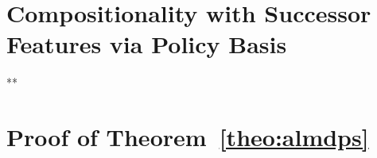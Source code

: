 \documentclass[12pt, a4paper,twoside]{tesi_upf}
\begin{document}
\chapter{Compositionality with Successor Features via Policy Basis}

% 




**\appendix
\chapter{Proof of Theorem~\ref{theo:almdps}}


\backmatter 
\printindex
% 

\end{document}
